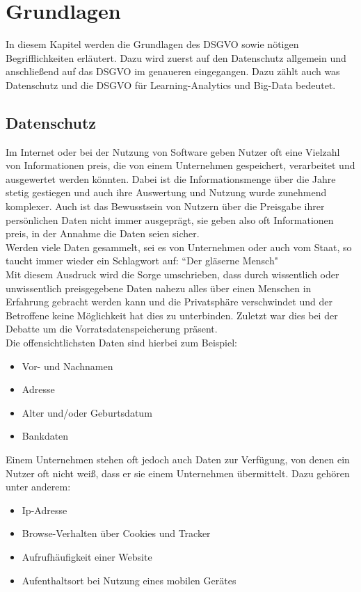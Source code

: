 \documentclass[a4paper, 12pt]{article}
\begin{document}
\section{Grundlagen}

In diesem Kapitel werden die Grundlagen des DSGVO sowie nötigen Begrifflichkeiten erläutert. Dazu wird zuerst auf den Datenschutz allgemein und anschließend auf das DSGVO im genaueren eingegangen. Dazu zählt auch was Datenschutz und die DSGVO für Learning-Analytics und Big-Data bedeutet.

\subsection{Datenschutz}\label{datenschutz_kap}

Im Internet oder bei der Nutzung von Software geben Nutzer oft eine Vielzahl von Informationen preis, die von einem Unternehmen gespeichert, verarbeitet und ausgewertet werden könnten. Dabei ist die Informationsmenge über die Jahre stetig gestiegen und auch ihre Auswertung und Nutzung wurde zunehmend komplexer. Auch ist das Bewusstsein von Nutzern über die Preisgabe ihrer persönlichen Daten nicht immer ausgeprägt, sie geben also oft Informationen preis, in der Annahme die Daten seien sicher.\\
Werden viele Daten gesammelt, sei es von Unternehmen oder auch vom Staat, so taucht immer wieder ein Schlagwort auf: ``Der gläserne Mensch"\\
Mit diesem Ausdruck wird die Sorge umschrieben, dass durch wissentlich oder unwissentlich preisgegebene Daten nahezu alles über einen Menschen in Erfahrung gebracht werden kann und die Privatsphäre verschwindet und der Betroffene keine Möglichkeit hat dies zu unterbinden. Zuletzt war dies bei der Debatte um die Vorratsdatenspeicherung präsent.\\

\noindent Die offensichtlichsten Daten sind hierbei zum Beispiel:
\begin{itemize}
\item Vor- und Nachnamen
\item Adresse 
\item Alter und/oder Geburtsdatum
\item Bankdaten
\end{itemize}

\noindent 
Einem Unternehmen stehen oft jedoch auch Daten zur Verfügung, von denen ein Nutzer oft nicht weiß, dass er sie einem Unternehmen übermittelt. Dazu gehören unter anderem:
\begin{itemize}
\item Ip-Adresse
\item Browse-Verhalten über Cookies und Tracker
\item Aufrufhäufigkeit einer Website
\item Aufenthaltsort bei Nutzung eines mobilen Gerätes
\end{itemize}
\end{document}
